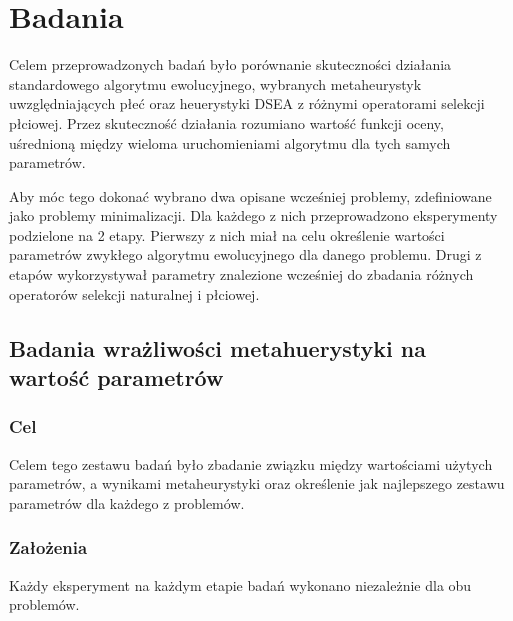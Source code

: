 \documentclass[./FM_mgr.tex]{subfiles}
\begin{document}
\section{Badania} \label{chapter:research}


Celem przeprowadzonych badań było porównanie skuteczności działania standardowego algorytmu ewolucyjnego, wybranych metaheurystyk uwzględniających płeć oraz heuerystyki DSEA z różnymi operatorami selekcji płciowej.
Przez skuteczność działania rozumiano wartość funkcji oceny, uśrednioną między wieloma uruchomieniami algorytmu dla tych samych parametrów.

Aby móc tego dokonać wybrano dwa opisane wcześniej problemy, zdefiniowane jako problemy minimalizacji. 
Dla każdego z nich przeprowadzono eksperymenty podzielone na 2 etapy.
Pierwszy z nich miał na celu określenie wartości parametrów zwykłego algorytmu ewolucyjnego dla danego problemu.
Drugi z etapów wykorzystywał parametry znalezione wcześniej do zbadania różnych operatorów selekcji naturalnej i płciowej.

\subsection{Badania wrażliwości metahuerystyki na wartość parametrów}
\label{subsection:init_params}

\subsubsection*{Cel}
Celem tego zestawu badań było zbadanie związku między wartościami użytych parametrów, a wynikami metaheurystyki oraz określenie jak najlepszego zestawu parametrów dla każdego z problemów.

\subsubsection*{Założenia}
Każdy eksperyment na każdym etapie badań wykonano niezależnie dla obu problemów. 
\end{document}
